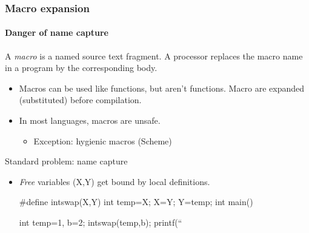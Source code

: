 \documentclass{beamer}
\begin{document}
\begin{frame}[fragile]
\frametitle{Macro expansion}
\framesubtitle{Danger of name capture}
A \textit{macro} is a named source text fragment. A  processor
replaces the macro name in a program by the corresponding body.
\bigskip 


\begin{itemize}
\item Macros can be used like functions, but aren't functions. Macro
are expanded (substituted) before compilation. 
\item In most languages, macros are unsafe.
\begin{itemize}
\item Exception: hygienic macros (Scheme)
\end{itemize}
\end{itemize}

Standard problem: name capture
\begin{itemize}
\item \textit{Free} variables (X,Y) get bound by local definitions. 
\begin{cplus3}
#define intswap(X,Y) {int temp=X; X=Y; Y=temp;}
int main() {
    int temp=1, b=2;                 
    intswap(temp,b);
    printf(``%

}
\end{cplus3}
\end{itemize}
\end{frame}
\end{document}
